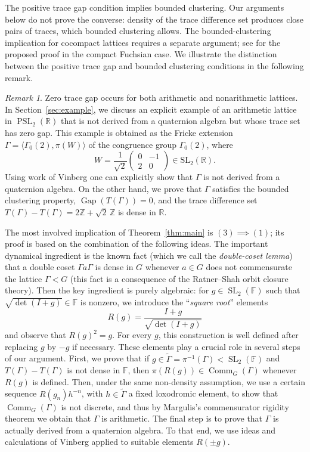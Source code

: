 \documentclass[reqno]{amsart}
\theoremstyle{remark}
\newtheorem{remark}[theorem]{Remark}
\DeclareMathOperator{\Comm}{Comm}
\DeclareMathOperator{\Gap}{Gap}
\DeclareMathOperator{\SL}{SL}
\DeclareMathOperator{\PSL}{PSL}
\newcommand{\R}{\mathbb R}
\newcommand{\F}{\mathbb F}
\newcommand{\G}{\widetilde\Gamma}
\begin{document}
The positive trace gap condition implies bounded clustering. Our arguments below do not prove the converse: density of the trace difference set produces close pairs of traces, which bounded clustering allows. The bounded-clustering implication for cocompact lattices requires a separate argument; see \cite{TraceSparsityManuscript} for the proposed proof in the compact Fuchsian case. We illustrate the distinction between the positive trace gap and bounded clustering conditions in the following remark.

\begin{remark}
Zero trace gap occurs for both arithmetic and nonarithmetic lattices. In Section~\ref{sec:example}, we discuss an explicit example of an arithmetic lattice in $\PSL_2(\R)$ that is not derived from a quaternion algebra but whose trace set has zero gap. This example is obtained as the Fricke extension $\Gamma=\langle\Gamma_0(2),\pi(W)\rangle$ of the congruence group $\Gamma_0(2)$, where
$$
W=\frac1{\sqrt2}
\begin{pmatrix}0&-1\\2&0\end{pmatrix} \in\mathrm{SL}_2(\mathbb R).
$$
Using work of Vinberg \cite{Vinberg} one can explicitly show that $\Gamma$ is not derived from a quaternion algebra. On the other hand, we prove that $\Gamma$ satisfies the bounded clustering property, $\Gap(T(\Gamma)) = 0$, and the trace difference set $T(\Gamma)-T(\Gamma) = 2\mathbb Z+\sqrt2\,\mathbb Z$ is dense in $\R$.
\end{remark}

The most involved implication of Theorem~\ref{thm:main} is $(3) \implies (1)$; its proof is based on the combination of the following ideas. The important dynamical ingredient is the known fact (which we call the {\em double-coset lemma}) that a double coset $\Gamma a\Gamma$ is dense in $G$ whenever $a \in G$ does not commensurate the lattice $\Gamma < G$ (this fact is a consequence of the Ratner--Shah orbit closure theory). Then the key ingredient is purely algebraic: for $g\in\SL_2(\F)$ such that $\sqrt{\det(I+g)} \in \F$ is nonzero, we introduce the ``{\em square root}'' elements
$$
R(g) = \frac{I+g}{\sqrt{\det(I+g)}}
$$
and observe that $R(g)^2 = g$. For every $g$, this construction is well defined after replacing $g$ by $-g$ if necessary. These elements play a crucial role in several steps of our argument. First, we prove that if $g\in\G = \pi^{-1}(\Gamma) < \SL_2(\F)$ and $T(\Gamma)-T(\Gamma)$ is not dense in $\F$, then $\pi(R(g))\in\Comm_G(\Gamma)$ whenever $R(g)$ is defined. Then, under the same non-density assumption, we use a certain sequence $R(g_n)h^{-n}$, with $h\in\G$ a fixed loxodromic element, to show that $\Comm_G(\Gamma)$ is not discrete, and thus by Margulis's commensurator rigidity theorem we obtain that $\Gamma$ is arithmetic. The final step is to prove that $\Gamma$ is actually derived from a quaternion algebra. To that end, we use ideas and calculations of Vinberg \cite{Vinberg} applied to suitable elements $R(\pm g)$.
\end{document}
